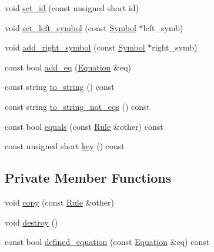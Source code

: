 \begin{DoxyCompactItemize}
\item 
void \hyperlink{classgenevalmag_1_1Rule_af1f423dd609fc03692dd44a9b421d0eb}{set\_\-id} (const unsigned short id)
\item 
void \hyperlink{classgenevalmag_1_1Rule_aadb73aec92b549b69e2a46c5d0fb0c02}{set\_\-left\_\-symbol} (const \hyperlink{classgenevalmag_1_1Symbol}{Symbol} $\ast$left\_\-symb)
\item 
void \hyperlink{classgenevalmag_1_1Rule_aad3d9a79889338ef270de09fcbf91729}{add\_\-right\_\-symbol} (const \hyperlink{classgenevalmag_1_1Symbol}{Symbol} $\ast$right\_\-symb)
\item 
const bool \hyperlink{classgenevalmag_1_1Rule_a55196f34d7b5a4793e089f1332d4c8b0}{add\_\-eq} (\hyperlink{classgenevalmag_1_1Equation}{Equation} \&eq)
\item 
const string \hyperlink{classgenevalmag_1_1Rule_a5efc9f6c6c576c52937ece211333a743}{to\_\-string} () const 
\item 
const string \hyperlink{classgenevalmag_1_1Rule_ab29cbf1ccafc2585524ee9cdbe58362b}{to\_\-string\_\-not\_\-eqs} () const 
\item 
const bool \hyperlink{classgenevalmag_1_1Rule_a3e625589d6f1d8575c625a60d1dd210c}{equals} (const \hyperlink{classgenevalmag_1_1Rule}{Rule} \&other) const 
\item 
const unsigned short \hyperlink{classgenevalmag_1_1Rule_a3f83cca5fc997bdc3c6404eaa57a17ca}{key} () const 
\end{DoxyCompactItemize}
\subsection*{Private Member Functions}
\begin{DoxyCompactItemize}
\item 
void \hyperlink{classgenevalmag_1_1Rule_a79dbd2cb842fc959aa78e178daca89e2}{copy} (const \hyperlink{classgenevalmag_1_1Rule}{Rule} \&other)
\item 
void \hyperlink{classgenevalmag_1_1Rule_a9089d3054bc30429fa27800720980df1}{destroy} ()
\item 
const bool \hyperlink{classgenevalmag_1_1Rule_a17ed3eece9dc6599966b4d97a249af5a}{defined\_\-equation} (const \hyperlink{classgenevalmag_1_1Equation}{Equation} \&eq) const 
\end{DoxyCompactItemize}
